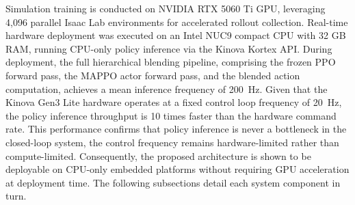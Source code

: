 \documentclass[lettersize,journal]{IEEEtran}
\begin{document}
Simulation training is conducted on NVIDIA RTX 5060 Ti GPU, leveraging 4,096 parallel Isaac Lab environments for accelerated rollout collection. Real-time hardware deployment was executed on an Intel NUC9 compact CPU with 32 GB RAM, running CPU-only policy inference via the Kinova Kortex API. During deployment, the full hierarchical blending pipeline, comprising the frozen PPO forward pass, the MAPPO actor forward pass, and the blended action computation, achieves a mean inference frequency of 200~Hz. Given that the Kinova Gen3 Lite hardware operates at a fixed control loop frequency of 20~Hz, the policy inference throughput is 10 times faster than the hardware command rate. This performance confirms that policy inference is never a bottleneck in the closed-loop system, the control frequency remains hardware-limited rather than compute-limited. Consequently, the proposed architecture is shown to be deployable on CPU-only embedded platforms without requiring GPU acceleration at deployment time. The following subsections detail each system component in turn.
\end{document}
